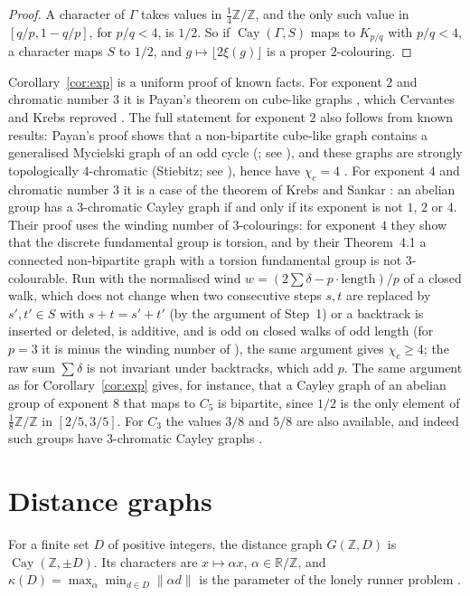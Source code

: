 \documentclass[11pt,a4paper]{amsart}
\theoremstyle{definition}
\newcommand{\R}{\mathbb{R}}
\newcommand{\Z}{\mathbb{Z}}
\newcommand{\Cay}{\operatorname{Cay}}
\newcommand{\RZ}{\R/\Z}
\begin{document}
\begin{proof}
A character of $\Gamma$ takes values in $\tfrac14\Z/\Z$, and the only such value in $[q/p,1-q/p]$, for $p/q<4$, is
$1/2$. So if $\Cay(\Gamma,S)$ maps to $K_{p/q}$ with $p/q<4$, a character maps $S$ to $1/2$, and
$g\mapsto\lfloor2\xi(g)\rfloor$ is a proper $2$-colouring.
\end{proof}

Corollary~\ref{cor:exp} is a uniform proof of known facts. For exponent $2$ and chromatic number $3$ it is Payan's
theorem on cube-like graphs \cite{Payan}, which Cervantes and Krebs reproved \cite{CK2}. The full statement for
exponent $2$ also follows from known results: Payan's proof shows that a non-bipartite cube-like graph contains a
generalised Mycielski graph of an odd cycle (\cite{Payan}; see \cite[Theorem~1.4]{BNT}), and these graphs are
strongly topologically $4$-chromatic (Stiebitz; see \cite[Proposition~9]{ST}), hence have $\chi_c=4$
\cite[Theorem~6]{ST}. For exponent $4$ and chromatic number $3$ it is a case of the theorem of Krebs and Sankar
\cite[Theorem~1.2]{KS}: an abelian group has a $3$-chromatic Cayley graph if and only if its exponent is not $1$,
$2$ or $4$. Their proof uses the winding number of $3$-colourings: for exponent $4$ they show that the discrete
fundamental group is torsion, and by their Theorem~4.1 a connected non-bipartite graph with a torsion fundamental
group is not $3$-colourable. Run with the normalised wind $w=(2\sum\delta-p\cdot\mathrm{length})/p$ of a closed walk,
which does not change when two consecutive steps $s,t$ are replaced by $s',t'\in S$ with $s+t=s'+t'$ (by the
argument of Step~1) or a backtrack is inserted or deleted, is
additive, and is odd on closed walks of odd length (for $p=3$ it is minus the winding number of \cite{KS}), the same
argument gives $\chi_c\ge4$; the raw sum $\sum\delta$ is not invariant under backtracks, which add $p$. The same argument as for
Corollary~\ref{cor:exp} gives, for instance, that a Cayley graph of an abelian group of exponent $8$ that maps to
$C_5$ is bipartite, since $1/2$ is the only element of $\tfrac18\Z/\Z$ in $[2/5,3/5]$. For $C_3$ the values $3/8$
and $5/8$ are also available, and indeed such groups have $3$-chromatic Cayley graphs \cite{KS}.

\section{Distance graphs}\label{sec:dist}

For a finite set $D$ of positive integers, the distance graph $G(\Z,D)$ is $\Cay(\Z,\pm D)$. Its characters are
$x\mapsto\alpha x$, $\alpha\in\RZ$, and $\kappa(D)=\max_\alpha\min_{d\in D}\|\alpha d\|$ is the parameter of the
lonely runner problem \cite{Liu,PS}.
\end{document}
